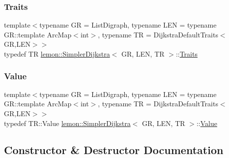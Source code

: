 \mbox{\label{classlemon_1_1_simpler_dijkstra_aba2e25936434ef18b495a05a4b785220}} 
\subsubsection{\texorpdfstring{Traits}{Traits}}
{\footnotesize\ttfamily template$<$typename GR = List\+Digraph, typename L\+EN = typename G\+R\+::template Arc\+Map$<$int$>$, typename TR = Dijkstra\+Default\+Traits$<$\+G\+R,\+L\+E\+N$>$$>$ \\
typedef TR \hyperlink{classlemon_1_1_simpler_dijkstra}{lemon\+::\+Simpler\+Dijkstra}$<$ GR, L\+EN, TR $>$\+::\hyperlink{classlemon_1_1_simpler_dijkstra_aba2e25936434ef18b495a05a4b785220}{Traits}}

\mbox{\label{classlemon_1_1_simpler_dijkstra_adbbec2bbc5762ccc02fee8089e30836a}} 
\subsubsection{\texorpdfstring{Value}{Value}}
{\footnotesize\ttfamily template$<$typename GR = List\+Digraph, typename L\+EN = typename G\+R\+::template Arc\+Map$<$int$>$, typename TR = Dijkstra\+Default\+Traits$<$\+G\+R,\+L\+E\+N$>$$>$ \\
typedef T\+R\+::\+Value \hyperlink{classlemon_1_1_simpler_dijkstra}{lemon\+::\+Simpler\+Dijkstra}$<$ GR, L\+EN, TR $>$\+::\hyperlink{classlemon_1_1_simpler_dijkstra_adbbec2bbc5762ccc02fee8089e30836a}{Value}}



\subsection{Constructor \& Destructor Documentation}
\mbox{\label{classlemon_1_1_simpler_dijkstra_aafa6d31f7d5de94342454613f321aff8}} 
